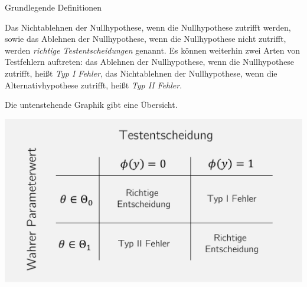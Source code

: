 \documentclass[
  8pt,
  ignorenonframetext,
]{beamer}
\begin{document}
\begin{frame}{Grundlegende Definitionen}
\protect\hypertarget{grundlegende-definitionen-8}{}
\small
\begin{definition}
\justifying
Das Nichtablehnen der Nullhypothese, wenn die Nullhypothese zutrifft werden,
sowie das Ablehnen der Nullhypothese, wenn die Nullhypothese nicht zutrifft,
werden \textit{richtige Testentscheidungen} genannt. Es können weiterhin zwei
Arten von Testfehlern auftreten: das Ablehnen der Nullhypothese, wenn die
Nullhypothese zutrifft, heißt \textit{Typ I Fehler}, das Nichtablehnen der
Nullhypothese, wenn die Alternativhypothese zutrifft, heißt
\textit{Typ II Fehler}.
\end{definition}

Die untenstehende Graphik gibt eine Übersicht. \vspace{1mm}

\begin{center}\includegraphics[width=0.55\linewidth]{12_Abbildungen/wtfi_12_testfehler} \end{center}
\end{frame}
\end{document}
